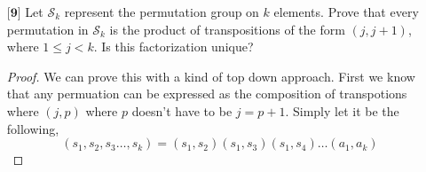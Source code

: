 \documentclass[12pt]{article}
\begin{document}
\begin{itemize}
\begin{itemize}
\begin{proof}
        The reason we know this is unique is because assume there exists another permutation $\alpha$ such that $\sigma\alpha = \tau$ and $\alpha \neq \tau$. That means,
        \begin{align*}
            \sigma\alpha &= \sigma\pi &&\text{We can compose with $\sigma^{-1}$ on the left}\\
            \sigma^{-1}\sigma\alpha &= \sigma^{-1}\sigma\pi \\
            e\alpha &= e\pi \\
            \alpha &= \pi  
        \end{align*}

        Which is a contradiction, and therefore $\pi$ is unique.
    \end{proof}
    
    \vspace{.3cm}
    \item[(b)]
    Prove that if $\sigma,\tau,\pi \in \mathcal{S}_k$ such that $\pi\sigma = \pi\tau$, then $\sigma = \tau$. 
    \begin{proof}
        This follows from part a. We know since we are in a group every permuation has an inverse permuation. 
        \begin{align*}
            \pi \sigma &= \pi \tau && \text{Comoposing with $\pi^{-1}$ on the left} \\
            \pi^{-1}\pi\sigma &= \pi^{-1}\pi\tau \\
            e\sigma &= e\tau \\
            \sigma &= \tau
        \end{align*}
        as desired.
    \end{proof}
    \end{itemize}
    
    \vspace{.5cm}
    \item[$\textbf{[9]}$]
    Let $\mathcal{S}_k$ represent the permutation group on $k$ elements. Prove that every permutation in $\mathcal{S}_k$ is the product of transpositions of the form $(j,j+1)$, where $1 \leq j < k$. Is this factorization unique?

    \begin{proof}
        We can prove this with a kind of top down approach. First we know that any permuation can be expressed as the composition of transpotions where $(j,p)$ where $p$ doesn't have to be $j=p+1$. Simply let it be the following,
        \[(s_1, s_2, s_3 \dots, s_k) = (s_1, s_2)(s_1,s_3)(s_1,s_4)\dots (a_1, a_k)\]


\end{proof}
\end{itemize}
\end{document}
